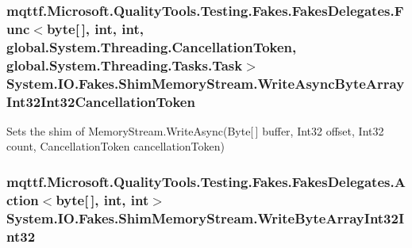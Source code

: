 \hypertarget{class_system_1_1_i_o_1_1_fakes_1_1_shim_memory_stream_aa9d87d964f70fb74647a57c40b4d8977}{
\subsubsection[{Write\-Async\-Byte\-Array\-Int32\-Int32\-Cancellation\-Token}]{\setlength{\rightskip}{0pt plus 5cm}mqttf.\-Microsoft.\-Quality\-Tools.\-Testing.\-Fakes.\-Fakes\-Delegates.\-Func$<$byte\mbox{[}$\,$\mbox{]}, int, int, global.\-System.\-Threading.\-Cancellation\-Token, global.\-System.\-Threading.\-Tasks.\-Task$>$ System.\-I\-O.\-Fakes.\-Shim\-Memory\-Stream.\-Write\-Async\-Byte\-Array\-Int32\-Int32\-Cancellation\-Token\hspace{0.3cm}{\ttfamily [set]}}}\label{class_system_1_1_i_o_1_1_fakes_1_1_shim_memory_stream_aa9d87d964f70fb74647a57c40b4d8977}


Sets the shim of Memory\-Stream.\-Write\-Async(\-Byte\mbox{[}$\,$\mbox{]} buffer, Int32 offset, Int32 count, Cancellation\-Token cancellation\-Token)

\hypertarget{class_system_1_1_i_o_1_1_fakes_1_1_shim_memory_stream_ad3d26153bb0d3d3099f9417c183070e3}{
\subsubsection[{Write\-Byte\-Array\-Int32\-Int32}]{\setlength{\rightskip}{0pt plus 5cm}mqttf.\-Microsoft.\-Quality\-Tools.\-Testing.\-Fakes.\-Fakes\-Delegates.\-Action$<$byte\mbox{[}$\,$\mbox{]}, int, int$>$ System.\-I\-O.\-Fakes.\-Shim\-Memory\-Stream.\-Write\-Byte\-Array\-Int32\-Int32\hspace{0.3cm}{\ttfamily [set]}}}\label{class_system_1_1_i_o_1_1_fakes_1_1_shim_memory_stream_ad3d26153bb0d3d3099f9417c183070e3}


